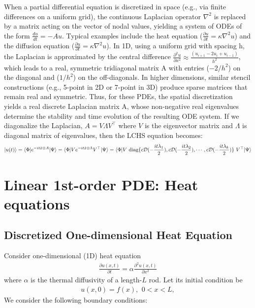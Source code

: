 \documentclass{article}
\begin{document}
When a partial differential equation is discretized in space (e.g., via finite differences on a uniform grid), the continuous Laplacian operator $\nabla^2$ is replaced by a matrix acting on the vector of nodal values, yielding a system of ODEs of the form $\frac{du}{dt} = -Au$. Typical examples include the heat equation ($\frac{\partial u}{\partial t} = \kappa \nabla^2u$) and the diffusion equation ($\frac{\partial u}{\partial t} = \kappa \nabla^2u$). In 1D, using a uniform grid with spacing h, the Laplacian is approximated by the central difference $\frac{\partial^2u}{\partial x^2} \approx \frac{(u_{i+1} - 2u_i + u_{i-1})}{h^2}$, which leads to a real, symmetric tridiagonal matrix A with entries ($-2/h^2$) on the diagonal and ($1/h^2$) on the off-diagonals. In higher dimensions, similar stencil constructions (e.g., 5-point in 2D or 7-point in 3D) produce sparse matrices that remain real and symmetric. Thus, for these PDEs, the spatial discretization yields a real discrete Laplacian matrix A, whose non-negative real eigenvalues determine the stability and time evolution of the resulting ODE system. If we diagonalize the Laplacian, $A=V\Lambda V^\top$ where $V$ is the eigenvector matrix and $\Lambda$ is diagonal matrix of eigenvalues, then the LCHS equation becomes:
\begin{align}
    \ket{u(t)}=\braket{\Phi|e^{-it\hat x\otimes A}|\Psi}=\braket{\Phi|Ve^{-it\hat x\otimes \Lambda}V^\top|\Psi}=\braket{\Phi|V\ \text{diag}\{c\mathcal{D}(-\frac{it\lambda_1}{2}), c\mathcal{D}(-\frac{it\lambda_2}{2}),\cdots, c\mathcal{D}(-\frac{it\lambda_k}{2})\}\ V^\top|\Psi}
\end{align}



\section{Linear 1st-order PDE:  Heat equations}
\subsection{Discretized One-dimensional Heat Equation}
\label{1d-heat}

Consider one-dimensional (1D) heat equation
\begin{align}
    \frac{\partial u(x,t)}{\partial t} = \alpha \frac{\partial^2 u(x,t)}{\partial x^2}
\end{align}
where $\alpha$ is the thermal diffusivity of a length-$L$ rod. Let its initial condition be
\begin{align*}
    u(x,0) = f(x), \,\ 0<x<L,
\end{align*}
We consider the following boundary conditions:
\end{document}
